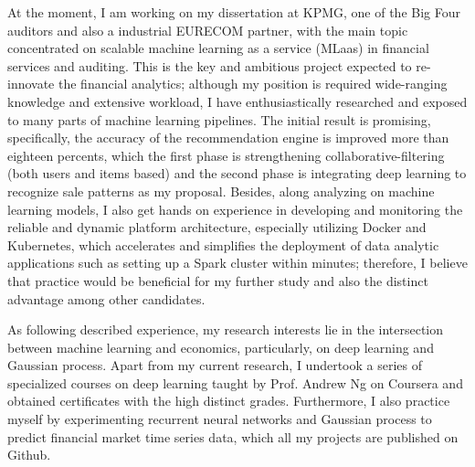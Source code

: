 \documentclass[10pt,a4paper,roman]{moderncv}        %
\begin{document}
At the moment, I am working on my dissertation at KPMG, one of the Big Four auditors and also a industrial EURECOM partner, with the main topic concentrated on scalable machine learning as a service (MLaas) in financial services and auditing. This is the key and ambitious project expected to re-innovate the financial analytics; although my position is required wide-ranging knowledge and extensive workload, I have enthusiastically researched and exposed to many parts of machine learning pipelines. The initial result is promising, specifically, the accuracy of the recommendation engine is improved more than eighteen percents, which the first phase is strengthening collaborative-filtering (both users and items based) and the second phase is integrating deep learning to recognize sale patterns as my proposal. Besides, along analyzing on machine learning models, I also get hands on experience in developing and monitoring the reliable and dynamic platform architecture, especially utilizing Docker and Kubernetes, which accelerates and simplifies the deployment of data analytic applications such as setting up a Spark cluster within minutes; therefore, I believe that practice would be beneficial for my further study and also the distinct advantage among other candidates.

As following described experience, my research interests lie in the intersection between machine learning and economics, particularly, on deep learning and Gaussian process. Apart from my current research, I undertook a series of specialized courses on deep learning taught by Prof. Andrew Ng on Coursera and obtained certificates with the high distinct grades. Furthermore, I also practice myself by experimenting recurrent neural networks and Gaussian process to predict financial market time series data, which all my projects are published on Github.





\vspace{0.5cm}


\makeletterclosing
\end{document}
